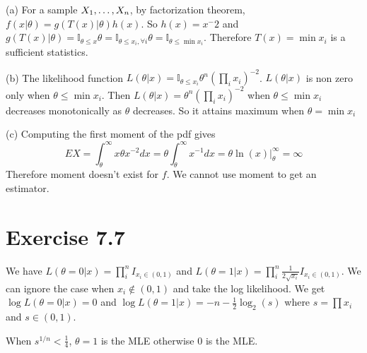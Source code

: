 \documentclass[12pt]{article}
\begin{document}
(a) For a sample $X_1,\ldots, X_n$, by factorization theorem, $f(x|\theta) = g(T(x)|\theta)h(x)$. So $h(x) = x^-2$ and $g(T(x)|\theta) =  \mathbb{I}_{\theta \leq x} \theta = \mathbb{I}_{\theta \leq x_i,  \forall i} \theta = \mathbb{I}_{\theta \leq \min{x_i} }$. Therefore $T(x) = \min{x_i}$ is a sufficient statistics.

(b) The likelihood function $L(\theta | x) = \mathbb{I}_{\theta \leq x_i} \theta^n (\prod_i x_i)^{-2}$. $L(\theta | x)$ is non zero only when $\theta \leq \min{x_i}$. Then $L(\theta | x) = \theta^n (\prod_i x_i)^{-2} $ when $\theta \leq \min{x_i}$ decreases monotonically as $\theta$ decreases. So it attains maximum when $\theta = \min{x_i}$

(c) Computing the first moment of the pdf gives 
$$EX = \int_{\theta}^{\infty} x \theta x^{-2} dx =\theta \int_{\theta}^{\infty} x^{-1} dx = \theta \ln(x)|_{\theta}^{\infty} = \infty$$
Therefore moment doesn't exist for $f$. We cannot use moment to get an estimator.

\section*{Exercise 7.7}
We have $L(\theta=0| x) = \prod_i^n I_{x_i \in (0, 1)} $ and $L(\theta=1|x) = \prod_i^n \frac{1}{2\sqrt{x_i}} I_{x_i \in (0,1)} $. We can ignore the case when $x_i \notin (0,1)$ and take the log likelihood. We get $\log L(\theta=0| x) = 0$ and $\log L(\theta=1|x) = -n - \frac{1}{2} \log_2 (s) $ where $s = \prod x_i$ and $s \in (0, 1)$.

When $s^{1/n} < \frac{1}{4}$, $\theta = 1$ is the MLE otherwise 0 is the MLE.
\end{document}
